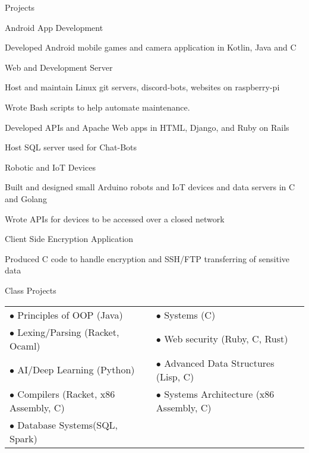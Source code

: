 \documentclass{resume} %
\begin{document}
\begin{rSection}{Projects}

\begin{rSubsection}{Android App Development}{}{}{}
\item Developed Android mobile games and camera application in Kotlin, Java and C
\end{rSubsection}

\begin{rSubsection}{Web and Development Server}{}{}{}
\item Host and maintain Linux git servers, discord-bots, websites on raspberry-pi
\item Wrote Bash scripts to help automate maintenance.
\item Developed APIs and Apache Web apps in HTML, Django, and Ruby on Rails
\item Host SQL server used for Chat-Bots
\end{rSubsection}

\begin{rSubsection}{Robotic and IoT Devices}{}{}{}
\item Built and designed small Arduino robots and IoT devices and data servers in C and Golang
\item Wrote APIs for devices to be accessed over a closed network
\end{rSubsection}

\begin{rSubsection}{Client Side Encryption Application}{}{}{}
\item Produced C code to handle encryption and SSH/FTP transferring of sensitive data
\end{rSubsection}

\begin{rSubsection}{Class Projects}{}{}{}
\begin{tabular}{l l}
$\bullet$ Principles of OOP (Java) &        $\bullet$ Systems (C)\\
$\bullet$ Lexing/Parsing (Racket, Ocaml) &  $\bullet$ Web security (Ruby, C, Rust)\\
$\bullet$ AI/Deep Learning (Python) &       $\bullet$ Advanced Data Structures (Lisp, C) \\
$\bullet$ Compilers (Racket, x86 Assembly, C) & $\bullet$ Systems Architecture (x86 Assembly, C)\\
$\bullet$ Database Systems(SQL, Spark) & 
\end{tabular}
\end{rSubsection}

\end{rSection}
\end{document}
